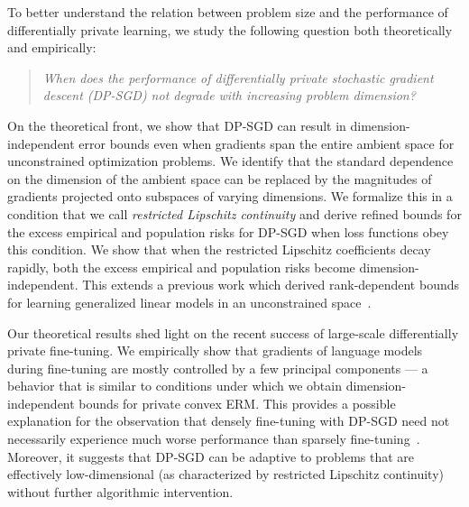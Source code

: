 To better understand the relation between problem size and the performance of differentially private learning, we study the following question both theoretically and empirically:
\begin{quote}
	\centering
	\emph{When does the performance of differentially private stochastic gradient descent (DP-SGD) not degrade with increasing problem dimension?}
\end{quote}

On the theoretical front, we show that DP-SGD can result in dimension-independent error bounds even when gradients span the entire ambient space for unconstrained optimization problems.
We identify that the standard dependence on the dimension of the ambient space can be replaced by the magnitudes of gradients projected onto subspaces of varying dimensions.
We formalize this in a condition that we call \textit{restricted Lipschitz continuity} and derive refined bounds for the excess empirical and population risks for DP-SGD when loss functions obey this condition. 
We show that when the restricted Lipschitz coefficients decay rapidly, both the excess empirical and population risks become dimension-independent.
This extends a previous work which derived rank-dependent bounds for learning generalized linear models in an unconstrained space~\cite{song2021evading}. 

Our theoretical results shed light on the recent success of large-scale differentially private fine-tuning.
We empirically show that gradients of language models during fine-tuning are mostly controlled by a few principal components --- a behavior that is similar to conditions under which we obtain dimension-independent bounds for private convex ERM. 
This provides a possible explanation for the observation that densely fine-tuning with DP-SGD need not necessarily experience much worse performance than sparsely fine-tuning~\cite{li2021large}. Moreover, it suggests that DP-SGD can be adaptive to problems that are effectively low-dimensional (as characterized by restricted Lipschitz continuity) without further algorithmic intervention.


